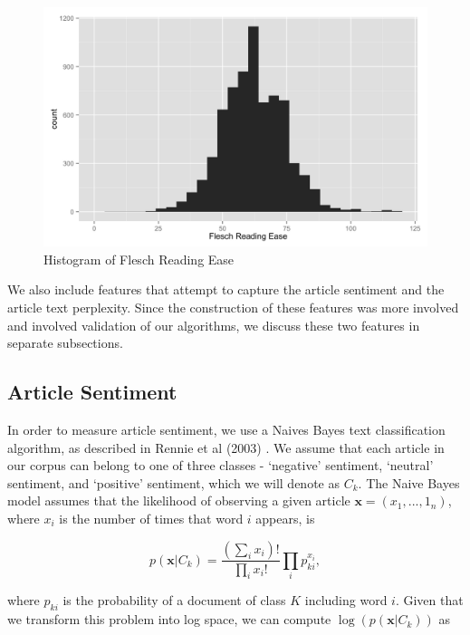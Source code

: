 \documentclass[fleqn,12pt]{SelfArx} %
\begin{document}
\begin{description}
\begin{figure}[ht]\centering
\includegraphics[width=\linewidth]{flesch_data_histogram.png}
\caption{Histogram of Flesch Reading Ease}
\label{fig:fre_hist}
\end{figure}	
	
\end{description}

We also include features that attempt to capture the article sentiment and the article text perplexity. Since the construction of these features was more involved and involved validation of our algorithms, we discuss these two features in separate subsections.

\subsection{Article Sentiment}

In order to measure article sentiment, we use a Naives Bayes text classification algorithm, as described in Rennie et al (2003) \cite{rennie2003tackling}. We assume that each article in our corpus can belong to one of three classes - `negative' sentiment, `neutral' sentiment, and `positive' sentiment, which we will denote as $C_k$. The Naive Bayes model assumes that the likelihood of observing a given article $\mathbf{x} = (x_1, ..., 1_n)$, where $x_i$ is the number of times that word $i$ appears, is 

\begin{equation}
p(\mathbf{x}|C_k) = \frac{\left ( \sum_i x_i \right )!}{\prod_i x_i !} \prod_i p_{ki}^{x_i},
\end{equation} 

\noindent where $p_{ki}$ is the probability of a document of class $K$ including word $i$. Given that we transform this problem into log space, we can compute $\log(p(\mathbf{x}|C_k))$ as 
\end{document}
